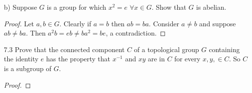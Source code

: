 \documentclass{amsart}
\begin{document}
b) Suppose $G$ is a group for which $x^2=e$ $\forall x\in G$. Show that $G$ is abelian.

\begin{proof}
Let $a,b\in G$. Clearly if $a=b$ then $ab=ba$. Consider $a\ne b$ and suppose $ab\ne ba$. Then $a^2b=eb\ne ba^2=be$, a contradiction. 
\end{proof}

7.3 Prove that the connected component $C$ of a topological group $G$ containing the identity $e$ has the property that $x^{-1}$ and $xy$ are in $C$ for every $x, y, \in C$. So $C$ is a subgroup of $G$.
\begin{proof}
\end{proof}
\end{document}
